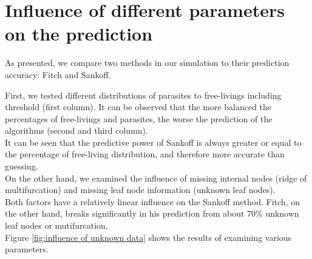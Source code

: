   \section{Influence of different parameters on the prediction} \label{sec:results - simulation}
    As presented, we compare two methods in our simulation to their prediction accuracy: Fitch and 
      Sankoff.

    First, we tested different distributions of parasites to free-livings including threshold (first 
      column). It can be observed that the more balanced the percentages of free-livings and parasites, 
      the worse the prediction of the algorithms (second and third column). \\
    It can be seen that the predictive power of Sankoff is always greater or equal to the percentage
      of free-living distribution, and therefore more accurate than guessing. \\
    On the other hand, we examined the influence of missing internal nodes (ridge of multifurcation) 
      and missing leaf node information (unknown leaf nodes). \\
    Both factors have a relatively linear influence on the Sankoff method. Fitch, on the other hand, 
      breaks significantly in his prediction from about 70\% unknown leaf nodes or mutifurcation. \\
    Figure \ref{fig:influence of unknown data} shows the results of examining various parameters.

